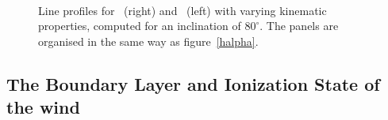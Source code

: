 \documentclass[preprint, a4paper, 11pt]{aastex}
\begin{document}


\begin{figure} %
\mbox{
\quad
{}   
}
\caption{
Line profiles for \heiiuv\ (right) and \heiiopt\  (left) with varying kinematic 
properties, computed for an inclination of $80^\circ$. 
The panels are organised in the same way as figure~\ref{halpha}.
}
\label{heiifig}
\end{figure}



\subsection{The Boundary Layer and Ionization State of the wind}


\end{document}
